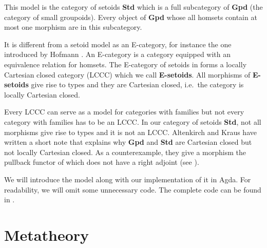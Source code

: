 \begin{remark}\label{nlccc}
This model is the category of setoids \textbf{Std} which is a full subcategory of \textbf{Gpd} (the category of small groupoids). Every object of \textbf{Gpd} whose all homsets contain at most one morphism are in this subcategory. 

It is different from a setoid model as an E-category, for instance
the one introduced by Hofmann \cite{hofmann1994interpretation}. An E-category is a category equipped with
an equivalence relation for homsets. The E-category of setoids in \mltt forms a locally Cartesian closed category (LCCC) which we call  \textbf{E-setoids}.  All morphisms of \textbf{E-setoids}
give rise to types and they are Cartesian closed, i.e.\ the category is locally
Cartesian closed.

Every LCCC can serve as a model for categories with
families but not every category with families has to be an LCCC. 
In our category of setoids \textbf{Std}, not all morphisms give rise to types and it is not an LCCC. 
Altenkirch and Kraus have written a short note that explains why \textbf{Gpd} and \textbf{Std} are Cartesian closed but not locally Cartesian closed.
As a counterexample,
they give a morphism the pullback functor of which does not have a right adjoint (see \cite{Altenkirch12setoidsare}).
\end{remark}




We will introduce the model along with our implementation of it in Agda. 
For readability, we will omit some unnecessary code. The complete code can be found in .


\section{Metatheory}

